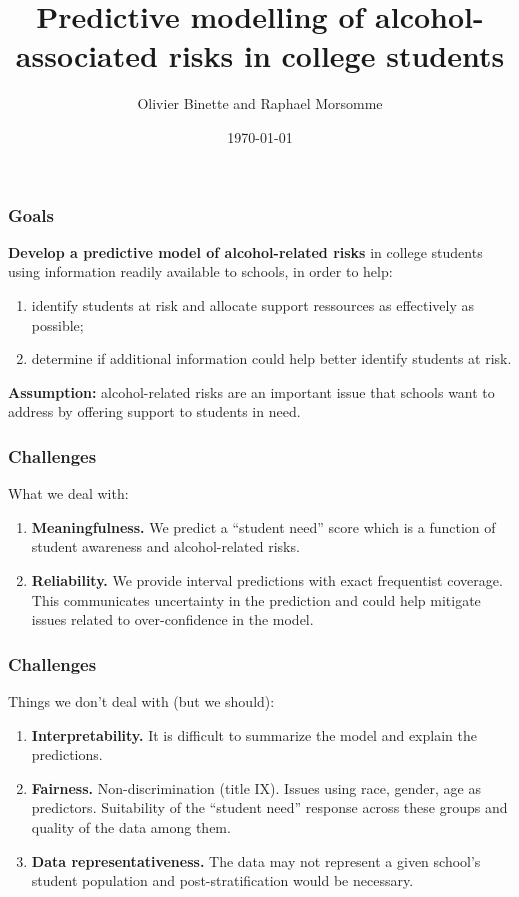 \documentclass{beamer}
\title{Predictive modelling of alcohol-associated risks in college students}
\author{Olivier Binette and Raphael Morsomme}
\date{\today}
\begin{document}
\frame{\titlepage}

\begin{frame} \frametitle{Goals}

\textbf{Develop a predictive model of alcohol-related risks} in college students using information readily available to schools, in order to help:

\begin{enumerate}
  \item identify students at risk and allocate support ressources as effectively as possible;
  \item determine if additional information could help better identify students at risk.
\end{enumerate}

\textbf{Assumption:} alcohol-related risks are an important issue that schools want to address by offering support to students in need.
  
\end{frame}


\begin{frame} \frametitle{Challenges}

What we deal with:

\begin{enumerate}
  \item \textbf{Meaningfulness.} We predict a ``student need'' score which is a function of student awareness and alcohol-related risks.
  \item \textbf{Reliability.} We provide interval predictions with exact frequentist coverage. This communicates uncertainty in the prediction and could help mitigate issues related to over-confidence in the model.
\end{enumerate}

\end{frame}

\begin{frame} \frametitle{Challenges}

Things we don't deal with (but we should):

\begin{enumerate}
  \item \textbf{Interpretability.} It is difficult to summarize the model and explain the predictions.
  \item \textbf{Fairness.} Non-discrimination (title IX). Issues using race, gender, age as predictors. Suitability of the ``student need'' response across these groups and quality of the data among them.
  \item \textbf{Data representativeness.} The data may not represent a given school's student population and post-stratification would be necessary.
\end{enumerate}

\end{frame}
\end{document}
